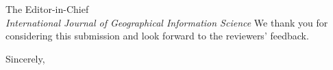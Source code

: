 \documentclass[11pt]{letter}
\begin{document}
\begin{letter}{The Editor-in-Chief \\ \emph{International Journal of Geographical Information Science}}
We thank you for considering this submission and look forward to the reviewers' feedback.

\closing{Sincerely,}

\end{letter}
\end{document}
